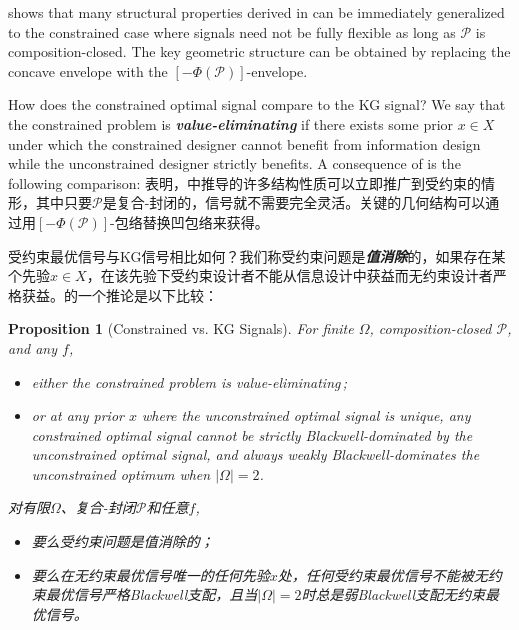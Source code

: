 \documentclass[12pt,letterpaper]{article}
\newenvironment{original}{\color{black}}{}
\newenvironment{translation}{\color{blue}}{}
\theoremstyle{plain}
\newtheorem{prop}{Proposition}
\theoremstyle{definition}
\theoremstyle{remark}
\theoremstyle{definition}
\begin{document}
\begin{original}
 shows that many structural properties derived in  \citet{Kamenica2011} can be immediately generalized to the constrained case where signals need not be fully flexible as long as $\mathcal{P}$ is composition-closed. The key geometric structure can be obtained by replacing the concave envelope with the $[-\Phi(\mathcal{P})]$-envelope.

How does the constrained optimal signal compare to the KG signal?
We say that the constrained problem is  \textit{\textbf{value-eliminating}} if there exists some prior $x \in X$ under which the constrained designer cannot benefit from information design while the unconstrained designer strictly benefits. A consequence of  is the following comparison:
\end{original}
\begin{translation}
表明，\citet{Kamenica2011}中推导的许多结构性质可以立即推广到受约束的情形，其中只要$\mathcal{P}$是复合-封闭的，信号就不需要完全灵活。关键的几何结构可以通过用$[-\Phi(\mathcal{P})]$-包络替换凹包络来获得。

受约束最优信号与KG信号相比如何？我们称受约束问题是\textit{\textbf{值消除}}的，如果存在某个先验$x \in X$，在该先验下受约束设计者不能从信息设计中获益而无约束设计者严格获益。的一个推论是以下比较：
\end{translation}

\begin{prop}[Constrained vs. KG Signals]\label{prop:comparison}
\begin{original}
For finite $\Omega$, composition-closed $\mathcal{P}$, and any $f$,
\begin{itemize}
    \item[(i)] either the constrained problem is value-eliminating\,;
    \item[(ii)] or at any prior $x$ where the unconstrained optimal signal is unique, any constrained optimal signal cannot be strictly Blackwell-dominated by the unconstrained optimal signal, and always weakly Blackwell-dominates the unconstrained optimum when $|\Omega| = 2$.
\end{itemize}
\end{original}
\begin{translation}
对有限$\Omega$、复合-封闭$\mathcal{P}$和任意$f$,
\begin{itemize}
    \item[(i)] 要么受约束问题是值消除的；
    \item[(ii)] 要么在无约束最优信号唯一的任何先验$x$处，任何受约束最优信号不能被无约束最优信号严格Blackwell支配，且当$|\Omega| = 2$时总是弱Blackwell支配无约束最优信号。
\end{itemize}
\end{translation}
\end{prop}
\end{document}
